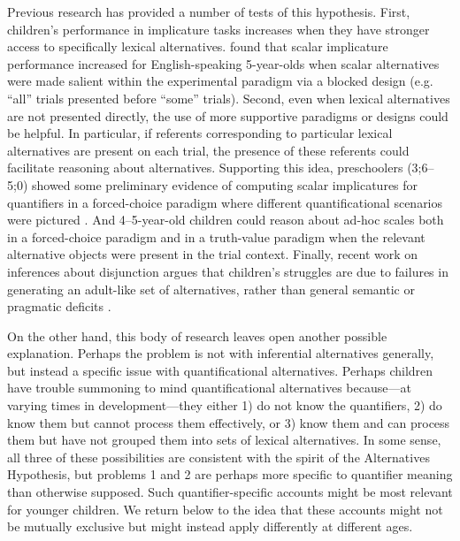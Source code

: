 \documentclass[man]{apa2}
\begin{document}
Previous research has provided a number of tests of this hypothesis. First, children's performance in implicature tasks increases when they have stronger access to specifically lexical alternatives.  found that scalar implicature performance increased for English-speaking 5-year-olds when scalar alternatives were made salient within the experimental paradigm via a blocked design (e.g. ``all'' trials presented before ``some'' trials). Second, even when lexical alternatives are not presented directly, the use of more supportive paradigms or designs could be helpful. In particular, if referents corresponding to particular lexical alternatives are present on each trial, the presence of these referents could facilitate reasoning about alternatives. Supporting this idea, preschoolers (3;6--5;0) showed some preliminary evidence of computing scalar implicatures for quantifiers in a forced-choice paradigm where different quantificational scenarios were pictured \cite{miller2005}. And 4--5-year-old children could reason about ad-hoc scales both in a forced-choice paradigm \cite{stiller2015} and in a truth-value paradigm \cite{barner2011} when the relevant alternative objects were present in the trial context. Finally, recent work on inferences about disjunction argues that children's struggles are due to failures in generating an adult-like set of alternatives, rather than general semantic or pragmatic deficits \cite{singh2016,tieu2016}.

On the other hand, this body of research leaves open another possible explanation. Perhaps the problem is not with inferential alternatives generally, but instead a specific issue with quantificational alternatives. Perhaps children have trouble summoning to mind quantificational alternatives because---at varying times in development---they either 1) do not know the quantifiers, 2) do know them but cannot process them effectively, or 3) know them and can process them but have not grouped them into sets of lexical alternatives. In some sense, all three of these possibilities are consistent with the spirit of the Alternatives Hypothesis, but problems 1 and 2 are perhaps more specific to quantifier meaning than otherwise supposed. Such quantifier-specific accounts might be most relevant for younger children. We return below to the idea that these accounts might not be mutually exclusive but might instead apply differently at different ages.
\end{document}
